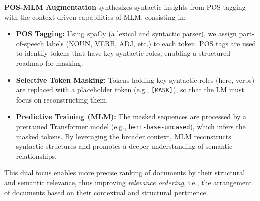 \textbf{POS-MLM Augmentation} synthesizes syntactic insights from POS tagging with the context-driven capabilities of MLM, consisting in:
\begin{itemize}
    \item \textbf{POS Tagging:} Using spaCy \cite{honnibal2017spacy} (a lexical and syntactic parser), we assign part-of-speech labels (NOUN, VERB, ADJ, etc.) to each token. POS tags are used to identify tokens that have key syntactic roles, enabling a structured roadmap for masking.
    \item \textbf{Selective Token Masking:} Tokens holding key syntactic roles (here, verbs) are replaced with a placeholder token (e.g., \texttt{[MASK]}), so that the LM must focus on reconstructing them.
    \item \textbf{Predictive Training (MLM):} The masked sequences are processed by a pretrained Transformer model (e.g., \texttt{bert-base-uncased}), which infers the masked tokens. By leveraging the broader context, MLM reconstructs syntactic structures and promotes a deeper understanding of semantic relationships.
\end{itemize}

This dual focus enables more precise ranking of documents by their structural and semantic relevance, thus improving \textit{relevance ordering}, i.e., the arrangement of documents based on their contextual and structural pertinence.

